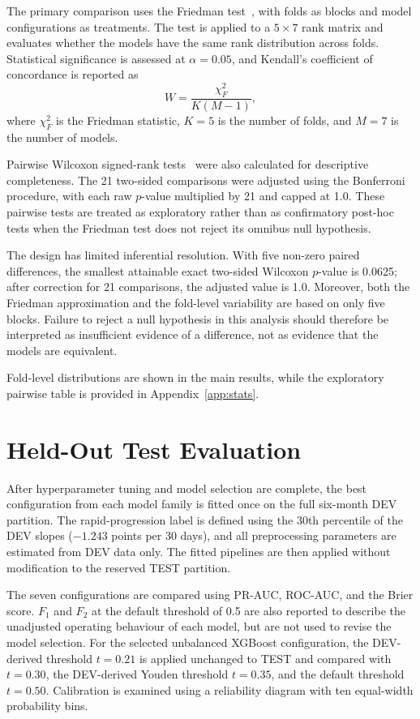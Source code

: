 The primary comparison uses the Friedman test~\cite{friedman1937ranks}, with folds as blocks and model configurations as treatments. The test is applied to a $5 \times 7$ rank matrix and evaluates whether the models have the same rank distribution across folds. Statistical significance is assessed at $\alpha=0.05$, and Kendall's coefficient of concordance is reported as
\[
W = \frac{\chi^2_F}{K(M-1)},
\]
where $\chi^2_F$ is the Friedman statistic, $K=5$ is the number of folds, and $M=7$ is the number of models.

Pairwise Wilcoxon signed-rank tests~\cite{wilcoxon1945} were also calculated for descriptive completeness. The 21 two-sided comparisons were adjusted using the Bonferroni procedure, with each raw $p$-value multiplied by 21 and capped at 1.0. These pairwise tests are treated as exploratory rather than as confirmatory post-hoc tests when the Friedman test does not reject its omnibus null hypothesis.

The design has limited inferential resolution. With five non-zero paired differences, the smallest attainable exact two-sided Wilcoxon $p$-value is 0.0625; after correction for 21 comparisons, the adjusted value is 1.0. Moreover, both the Friedman approximation and the fold-level variability are based on only five blocks. Failure to reject a null hypothesis in this analysis should therefore be interpreted as insufficient evidence of a difference, not as evidence that the models are equivalent.

Fold-level distributions are shown in the main results, while the exploratory pairwise table is provided in Appendix~\ref{app:stats}.

\section{Held-Out Test Evaluation}
\label{sec:methods_test_evaluation}
After hyperparameter tuning and model selection are complete, the best configuration from each model family is fitted once on the full six-month \gls{DEV} partition. The rapid-progression label is defined using the 30th percentile of the DEV slopes ($-1.243$ points per 30 days), and all preprocessing parameters are estimated from DEV data only. The fitted pipelines are then applied without modification to the reserved \gls{TEST} partition.

The seven configurations are compared using \gls{PR-AUC}, \gls{ROC-AUC}, and the Brier score. $F_1$ and $F_2$ at the default threshold of 0.5 are also reported to describe the unadjusted operating behaviour of each model, but are not used to revise the model selection. For the selected unbalanced XGBoost configuration, the DEV-derived threshold $t=0.21$ is applied unchanged to TEST and compared with $t=0.30$, the DEV-derived Youden threshold $t=0.35$, and the default threshold $t=0.50$. Calibration is examined using a reliability diagram with ten equal-width probability bins.

